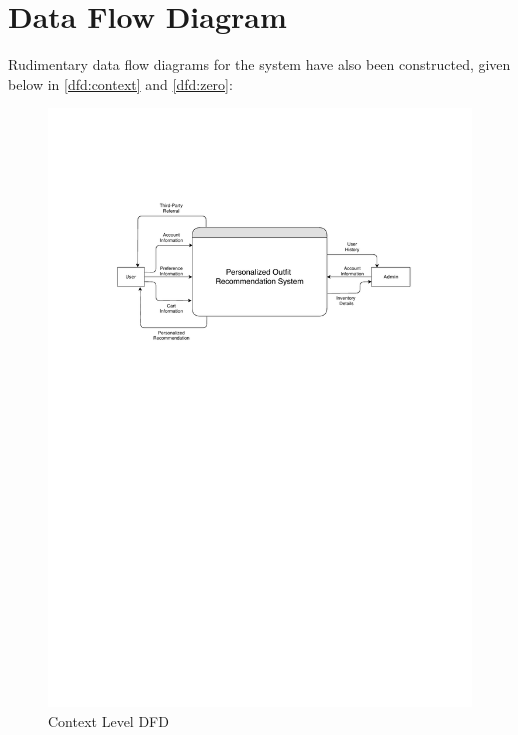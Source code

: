 \section{Data Flow Diagram}
Rudimentary data flow diagrams for the system have also been constructed, given below in \autoref{dfd:context} and \autoref{dfd:zero}:

\begin{figure}[H]
\includegraphics[width=15cm]{images/dfdContext.pdf} 
\centering
\caption{Context Level DFD}
\label{dfd:context}
\end{figure}

